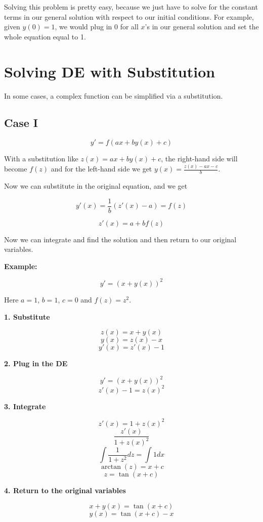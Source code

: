 Solving this problem is pretty easy, because we just have to solve for the constant terms
in our general solution with respect to our initial conditions. For example, given \(y(0) = 1\),
we would plug in 0 for all \(x\)'s in our general solution and set the whole equation equal to 1.

\section{Solving DE with Substitution}

In some cases, a complex function can be simplified via a substitution.

\subsection{Case I}

\[
    y' = f(ax + by(x) + c)
\]

With a substitution like \(z(x) = ax + by(x) + c\), the right-hand side will become \(f(z)\)
and for the left-hand side we get \(y(x) = \frac{z(x) - ax - c}{b}\).

Now we can substitute in the original equation, and we get

\[
    y'(x) = \frac{1}{b} (z'(x) - a) = f(z)
\]

\[
    z'(x) = a + b f(z)
\]

Now we can integrate and find the solution and then return to our original variables.

\textbf{Example:}

\[
    y' = (x + y(x))^2
\]

Here \(a = 1\), \(b = 1\), \(c = 0\) and \(f(z) = z^2\).

\textbf{1. Substitute}

\[
    z(x) = x + y(x)
\]
\[
    y(x) = z(x) - x
\]
\[
    y'(x) = z'(x) - 1
\]

\textbf{2. Plug in the DE}

\[
    y' = {(x + y(x))}^2
\]
\[
    z'(x) - 1 = {z(x)}^2
\]

\textbf{3. Integrate}

\[
    z'(x) = 1 + {z(x)}^2
\]
\[
    \frac{z'(x)}{1 + {z(x)}^2}
\]
\[
    \int \frac{1}{1 + z^2} dz = \int 1 dx
\]
\[
    \arctan (z) = x + c
\]
\[
    z = \tan(x + c)
\]

\textbf{4. Return to the original variables}

\[
    x + y(x) = \tan(x + c)
\]
\[
    y(x) = \tan(x + c) - x
\]

